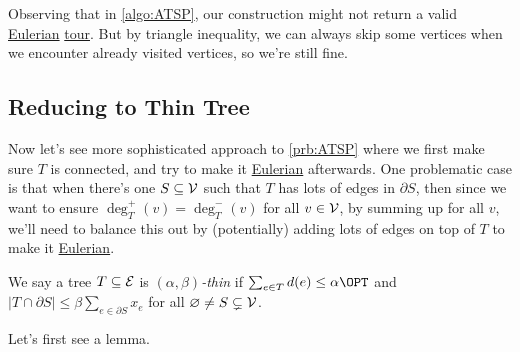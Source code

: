 \begin{remark}[Repetition]
	Observing that in \autoref{algo:ATSP}, our construction might not return a valid  \href{https://en.wikipedia.org/wiki/Eulerian_path}{Eulerian} \hyperref[def:tour]{tour}. But by triangle inequality, we can always skip some vertices when we encounter already visited vertices, so we're still fine.
\end{remark}

\subsection{Reducing to Thin Tree}
Now let's see more sophisticated approach to \autoref{prb:ATSP} where we first make sure \(T\) is connected, and try to make it  \href{https://en.wikipedia.org/wiki/Eulerian_path}{Eulerian} afterwards. One problematic case is that when there's one \(S \subseteq \mathcal{\MakeUppercase{v}} \) such that \(T\) has lots of edges in \(\partial S\), then since we want to ensure \(\deg^+_T(v) = \deg^-_T(v)\) for all \(v\in \mathcal{\MakeUppercase{v}} \), by summing up for all \(v\), we'll need to balance this out by (potentially) adding lots of edges on top of \(T\) to make it  \href{https://en.wikipedia.org/wiki/Eulerian_path}{Eulerian}.

\begin{definition}\label{def:thin}
	We say a tree \(T\subseteq \mathcal{\MakeUppercase{e}} \) is \emph{\((\alpha , \beta )\)-thin} if \(\sum_{e\in T} d(e) \leq \alpha \OPT\) and \(\left\vert T \cap \partial S \right\vert \leq \beta \sum_{e\in \partial S} x_e\) for all \(\varnothing \neq S \subsetneq \mathcal{\MakeUppercase{v}} \).
\end{definition}

Let's first see a lemma.

